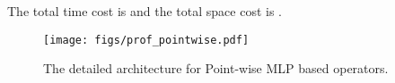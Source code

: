 \documentclass[runningheads]{llncs}
\begin{document}
The total time cost is  and the total space cost is .

\begin{figure}[t]
	\begin{center}
		\texttt{[image: figs/prof\_pointwise.pdf]}
	\end{center}
	\vspace{-2em}
	\caption{The detailed architecture for Point-wise MLP based operators.}
	\vspace{-1em}
	\label{fig:prof_pointwise}
\end{figure}\clearpage{}
\end{document}
